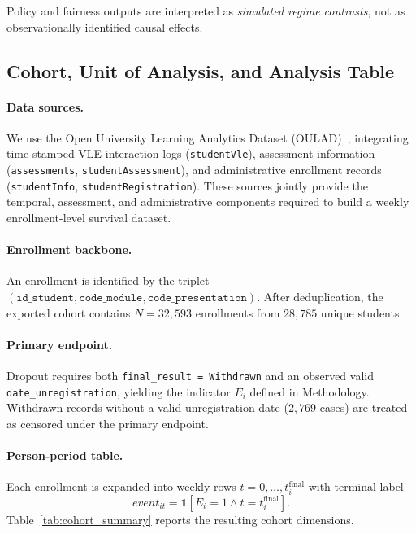 Policy and fairness outputs are interpreted as \textit{simulated regime contrasts}, not as observationally identified causal effects.

\subsection{Cohort, Unit of Analysis, and Analysis Table}
\label{subsec:cohort}

\paragraph*{Data sources.}
We use the Open University Learning Analytics Dataset (OULAD)~\cite{Kuzilek2017OULAD}, integrating time-stamped VLE interaction logs (\texttt{studentVle}), assessment information (\texttt{assessments}, \texttt{studentAssessment}), and administrative enrollment records (\texttt{studentInfo}, \texttt{studentRegistration}). These sources jointly provide the temporal, assessment, and administrative components required to build a weekly enrollment-level survival dataset.

\paragraph*{Enrollment backbone.}
An enrollment is identified by the triplet $(\texttt{id\_student},\allowbreak\texttt{code\_module},\allowbreak\texttt{code\_presentation})$. After deduplication, the exported cohort contains $N=32{,}593$ enrollments from $28{,}785$ unique students.

\paragraph*{Primary endpoint.}
Dropout requires both \texttt{final\_result = Withdrawn} and an observed valid \texttt{date\_unregistration}, yielding the indicator $E_i$ defined in Methodology. Withdrawn records without a valid unregistration date ($2{,}769$ cases) are treated as censored under the primary endpoint.

\paragraph*{Person-period table.}
Each enrollment is expanded into weekly rows $t=0,\dots,t_i^{\mathrm{final}}$ with terminal label
\[
event_{it}=\mathbb{1}[E_i=1 \wedge t=t_i^{\mathrm{final}}].
\]
Table~\ref{tab:cohort_summary} reports the resulting cohort dimensions.

